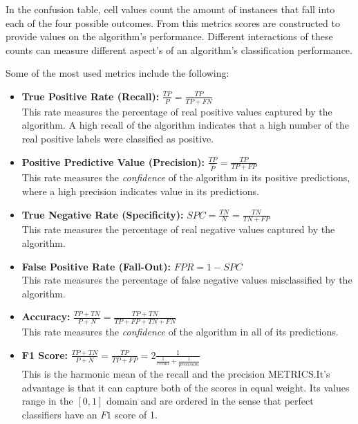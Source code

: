 In the confusion table, cell values count the amount of instances that fall into each of the four possible outcomes. From this metrics scores are constructed to provide values on the algorithm's performance. Different interactions of these counts can measure different aspect's of an algorithm's classification performance.


Some of the most used metrics include the following:

\begin{itemize}
\item \textbf{True Positive Rate (Recall):} $\frac{TP}{P} = \frac{TP}{TP + FN}$ \\ This rate measures the percentage of real positive values captured by the algorithm. A high recall of the algorithm indicates that a high number of the real positive labels were classified as positive.


\item \textbf{Positive Predictive Value (Precision):} $\frac{TP}{\hat{P}} = \frac{TP}{TP + FP}$ \\ This rate measures the \textit{confidence} of the algorithm in its positive predictions, where a high precision indicates value in its predictions.

\item \textbf{True Negative Rate (Specificity):} $ SPC = \frac{TN}{N} = \frac{TN}{TN + FP}$ \\ This rate measures the percentage of real negative values captured by the algorithm.


\item \textbf{False Positive Rate (Fall-Out):} $FPR = 1 - SPC$ \\ This rate measures the percentage of false negative values misclassified by the algorithm.

\item \textbf{Accuracy:} $\frac{TP + TN}{P + N} = \frac{TP + TN}{TP + FP + TN + FN}$ \\ This rate measures the \textit{confidence} of the algorithm in all of its predictions.

%
\item \textbf{F1 Score:} $\frac{TP + TN}{P + N} = \frac{TP}{TP + FP} = 2 \frac{1}{ \frac{1}{recall} + \frac{1}{precision} }$ \\ This is the harmonic mean of the recall and the precision METRICS.\@ It's advantage is that it can capture both of the scores in equal weight. Its values range in the ${[0,1 ]}$ domain and are ordered in the sense that perfect classifiers have an $F1$ score of 1.


\end{itemize}
